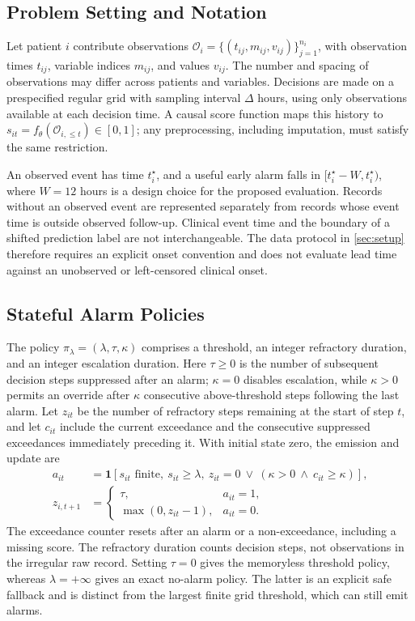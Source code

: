 \subsection{Problem Setting and Notation}

Let patient $i$ contribute observations $\mathcal{O}_i=\{(t_{ij},m_{ij},v_{ij})\}_{j=1}^{n_i}$, with observation times $t_{ij}$, variable indices $m_{ij}$, and values $v_{ij}$. The number and spacing of observations may differ across patients and variables. Decisions are made on a prespecified regular grid with sampling interval $\Delta$ hours, using only observations available at each decision time. A causal score function maps this history to $s_{it}=f_\theta(\mathcal{O}_{i,\le t})\in[0,1]$; any preprocessing, including imputation, must satisfy the same restriction.

An observed event has time $t_i^\star$, and a useful early alarm falls in $[t_i^\star-W,t_i^\star)$, where $W=12$ hours is a design choice for the proposed evaluation. Records without an observed event are represented separately from records whose event time is outside observed follow-up. Clinical event time and the boundary of a shifted prediction label are not interchangeable. The data protocol in \cref{sec:setup} therefore requires an explicit onset convention and does not evaluate lead time against an unobserved or left-censored clinical onset.

\subsection{Stateful Alarm Policies}

The policy $\pi_\lambda=(\lambda,\tau,\kappa)$ comprises a threshold, an integer refractory duration, and an integer escalation duration. Here $\tau\ge0$ is the number of subsequent decision steps suppressed after an alarm; $\kappa=0$ disables escalation, while $\kappa>0$ permits an override after $\kappa$ consecutive above-threshold steps following the last alarm. Let $z_{it}$ be the number of refractory steps remaining at the start of step $t$, and let $c_{it}$ include the current exceedance and the consecutive suppressed exceedances immediately preceding it. With initial state zero, the emission and update are
\begin{equation}
\label{eq:policy}
\begin{aligned}
a_{it}&=\mathbf{1}\!\left[s_{it}\text{ finite},\ s_{it}\ge\lambda,\
 z_{it}=0\ \vee\ (\kappa>0\ \wedge\ c_{it}\ge\kappa)\right],
\\
z_{i,t+1}&=\begin{cases}
\tau, & a_{it}=1,\\
\max(0,z_{it}-1), & a_{it}=0.
\end{cases}
\end{aligned}
\end{equation}
The exceedance counter resets after an alarm or a non-exceedance, including a missing score. The refractory duration counts decision steps, not observations in the irregular raw record. Setting $\tau=0$ gives the memoryless threshold policy, whereas $\lambda=+\infty$ gives an exact no-alarm policy. The latter is an explicit safe fallback and is distinct from the largest finite grid threshold, which can still emit alarms.

